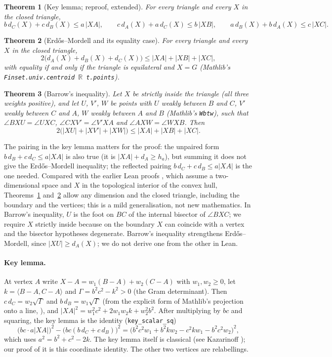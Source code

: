 \documentclass[11pt]{article}
\newtheorem{theorem}{Theorem}
\theoremstyle{definition}
\theoremstyle{remark}
\newcommand{\lean}[1]{\texttt{#1}}
\begin{document}
\begin{theorem}[Key lemma; reproof, extended]\label{thm:key}
For every triangle and every $X$ in the closed triangle,
\[
b\,d_C(X)+c\,d_B(X)\le a\,|XA|,\qquad c\,d_A(X)+a\,d_C(X)\le b\,|XB|,\qquad
a\,d_B(X)+b\,d_A(X)\le c\,|XC|.
\]
\end{theorem}
\begin{theorem}[Erdős--Mordell and its equality case]\label{thm:em}
For every triangle and every $X$ in the closed triangle,
\[
2\bigl(d_A(X)+d_B(X)+d_C(X)\bigr)\le|XA|+|XB|+|XC|,
\]
with equality if and only if the triangle is equilateral and $X=G$ (Mathlib's
\lean{Finset.univ.centroid \(\mathbb{R}\) t.points}).
\end{theorem}
\begin{theorem}[Barrow's inequality]\label{thm:barrow}
Let $X$ be strictly inside the triangle (all three weights positive), and let $U$, $V'$, $W$ be points
with $U$ weakly between $B$ and $C$, $V'$ weakly between $C$ and $A$, $W$ weakly between $A$ and $B$
(Mathlib's \lean{Wbtw}), such that $\angle BXU=\angle UXC$, $\angle CXV'=\angle V'XA$ and
$\angle AXW=\angle WXB$. Then
\[
2\bigl(|XU|+|XV'|+|XW|\bigr)\le|XA|+|XB|+|XC|.
\]
\end{theorem}
The pairing in the key lemma matters for the proof: the unpaired form $b\,d_B+c\,d_C\le a|XA|$
is also true (it is $|XA|+d_A\ge h_a$), but summing it does not give the Erdős--Mordell inequality;
the reflected pairing $b\,d_C+c\,d_B\le a|XA|$ is the one needed.
Compared with the earlier Lean proofs \cite{plby,lgmordell}, which assume a two-dimensional space and
$X$ in the topological interior of the convex hull, Theorems~\ref{thm:key} and~\ref{thm:em} allow
any dimension and the closed triangle, including the boundary and the vertices; this is a mild
generalisation, not new mathematics. In Barrow's inequality, $U$ is the foot on $BC$ of the internal
bisector of $\angle BXC$; we require $X$ strictly inside because on the boundary $X$ can coincide
with a vertex and the bisector hypotheses degenerate. Barrow's inequality strengthens Erdős--Mordell,
since $|XU|\ge d_A(X)$; we do not derive one from the other in Lean.

\paragraph{Key lemma.} At vertex $A$ write $X-A=w_1(B-A)+w_2(C-A)$ with $w_1,w_2\ge0$, let
$k=\langle B-A,C-A\rangle$ and $\Gamma=b^2c^2-k^2>0$ (the Gram determinant). Then
$c\,d_C=w_2\sqrt\Gamma$ and $b\,d_B=w_1\sqrt\Gamma$ (from the explicit form of Mathlib's projection
onto a line, ), and $|XA|^2=w_1^2c^2+2w_1w_2k+w_2^2b^2$. After
multiplying by $bc$ and squaring, the key lemma is the identity (\lean{key\_scalar\_sq})
\[
\bigl(bc\cdot a|XA|\bigr)^2-\bigl(bc(b\,d_C+c\,d_B)\bigr)^2
=\bigl(b^2c^2w_1+b^2kw_2-c^2kw_1-b^2c^2w_2\bigr)^2,
\]
which uses $a^2=b^2+c^2-2k$. The key lemma itself is classical (see Kazarinoff
\cite{kazarinoff1957}); our proof of it is this coordinate identity. The other two vertices are relabellings.
\end{document}
